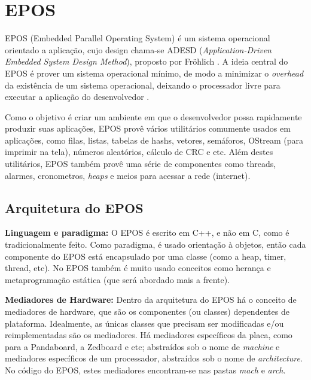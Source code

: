 
\chapter{EPOS}






EPOS (Embedded Parallel Operating System) é um sistema operacional orientado a aplicação, cujo design chama-se ADESD (\emph{Application-Driven Embedded System Design Method}), proposto por Fröhlich \cite{guto_thesis}. A ideia central do EPOS é prover um sistema operacional mínimo, de modo a minimizar o \emph{overhead} da existência de um sistema operacional, deixando o processador livre para executar a aplicação do desenvolvedor \cite{epos_user_guide}.

Como o objetivo é criar um ambiente em que o desenvolvedor possa rapidamente produzir suas aplicações, EPOS provê vários utilitários comumente usados em aplicações, como filas, listas, tabelas de hashs, vetores, semáforos, OStream (para imprimir na tela), números aleatórios, cálculo de CRC e etc. Além destes utilitários, EPOS também provê uma série de componentes como threads, alarmes, cronometros, \emph{heaps} e meios para acessar a rede (internet).

\section{Arquitetura do EPOS}


\textbf{Linguagem e paradigma:} O EPOS é escrito em C++, e não em C, como é tradicionalmente feito. Como paradigma, é usado orientação à objetos, então cada componente do EPOS está encapsulado por uma classe (como a heap, timer, thread, etc). No EPOS também é muito usado conceitos como herança e metaprogramação estática (que será abordado mais a frente).

\textbf{Mediadores de Hardware:} Dentro da arquitetura do EPOS há o conceito de mediadores de hardware, que são os componentes (ou classes) dependentes de plataforma. Idealmente, as únicas classes que precisam ser modificadas e/ou reimplementadas são os mediadores. Há mediadores específicos da placa, como para a Pandaboard, a Zedboard e etc; abstraídos sob o nome de \emph{machine} e mediadores específicos de um processador, abstraídos sob o nome de \emph{architecture}. No código do EPOS, estes mediadores encontram-se nas pastas \emph{mach} e \emph{arch}.

